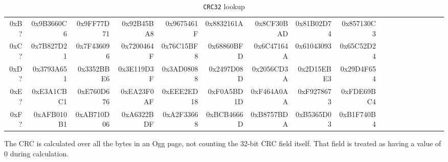 \begin{table}[h]
{\begin{tabular}{|r||r|r|r|r|r|r|r|r|r|r|r|r|r|r|r|r|r|}
    0xB? & 0x9B3660C6 & 0x9FF77D71 & 0x92B45BA8 & 0x9675461F &
    0x8832161A & 0x8CF30BAD & 0x81B02D74 & 0x857130C3 \\
    0xC? & 0x7B827D21 & 0x7F436096 & 0x7200464F & 0x76C15BF8 &
    0x68860BFD & 0x6C47164A & 0x61043093 & 0x65C52D24 \\
    0xD? & 0x3793A651 & 0x3352BBE6 & 0x3E119D3F & 0x3AD08088 &
    0x2497D08D & 0x2056CD3A & 0x2D15EBE3 & 0x29D4F654 \\
    0xE? & 0xE3A1CBC1 & 0xE760D676 & 0xEA23F0AF & 0xEEE2ED18 &
    0xF0A5BD1D & 0xF464A0AA & 0xF9278673 & 0xFDE69BC4 \\
    0xF? & 0xAFB010B1 & 0xAB710D06 & 0xA6322BDF & 0xA2F33668 &
    0xBCB4666D & 0xB8757BDA & 0xB5365D03 & 0xB1F740B4 \\
    \hline
  \end{tabular}
}
\caption{\texttt{CRC32} lookup}
\end{table}
\par
\noindent
The CRC is calculated over all the bytes in an Ogg page,
not counting the 32-bit CRC field itself.
That field is treated as having a value of 0 during calculation.
